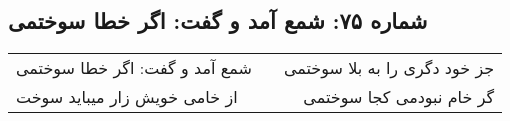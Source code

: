 \begin{center}
\section*{شماره ۷۵: شمع آمد و گفت: اگر خطا سوختمی}
\label{sec:075}
\begin{longtable}{l p{0.5cm} r}
شمع آمد و گفت: اگر خطا سوختمی
&&
جز خود دگری را به بلا سوختمی
\\
از خامی خویش زار میباید سوخت
&&
گر خام نبودمی کجا سوختمی
\\
\end{longtable}
\end{center}
